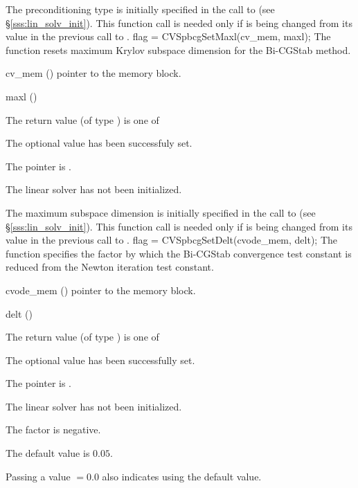 {
  The preconditioning type is initially specified in the call
  to  (see \S\ref{sss:lin_solv_init}). This function call is
  needed only if  is being changed from its value in the
  previous call to .
}
{
  flag = CVSpbcgSetMaxl(cv\_mem, maxl);
}
{
  The function  resets maximum Krylov subspace
  dimension for the Bi-CGStab method.
}
{
  \begin{args}[cv\_mem]
  \item[cv\_mem] ()
    pointer to the {\cvode} memory block.
  \item[maxl] ()

  \end{args}
}
{
  The return value  (of type ) is one of
  \begin{args}
  \item[\Id{CVSPBCG\_SUCCESS}] 
    The optional value has been successfuly set.
  \item[\Id{CVSPBCG\_MEM\_NULL}]
    The  pointer is .
  \item[\Id{CVSPBCG\_LMEM\_NULL}]
    The {\cvspbcg} linear solver has not been initialized.
  \end{args}
}
{
  The maximum subspace dimension is initially specified in the call
  to  (see \S\ref{sss:lin_solv_init}). This function call is
  needed only if  is being changed from its value in the
  previous call to .
}
{
  flag = CVSpbcgSetDelt(cvode\_mem, delt);
}
{
  The function  specifies the factor by which the
  Bi-CGStab convergence test constant is reduced
  from the Newton iteration test constant.
}
{
  \begin{args}
  \item[cvode\_mem] ()
    pointer to the {\cvode} memory block.
  \item[delt] ()

  \end{args}
}
{
  The return value  (of type ) is one of
  \begin{args}
  \item[\Id{CVSPBCG\_SUCCESS}] 
    The optional value has been successfully set.
  \item[\Id{CVSPBCG\_MEM\_NULL}]
    The  pointer is .
  \item[\Id{CVSPBCG\_LMEM\_NULL}]
    The {\cvspbcg} linear solver has not been initialized.
  \item[\Id{CVSPBCG\_ILL\_INPUT}]
    The factor  is negative.  
  \end{args}
}
{
  The default value is $0.05$.

  Passing a value $ = 0.0$ also indicates using the default value.
}

